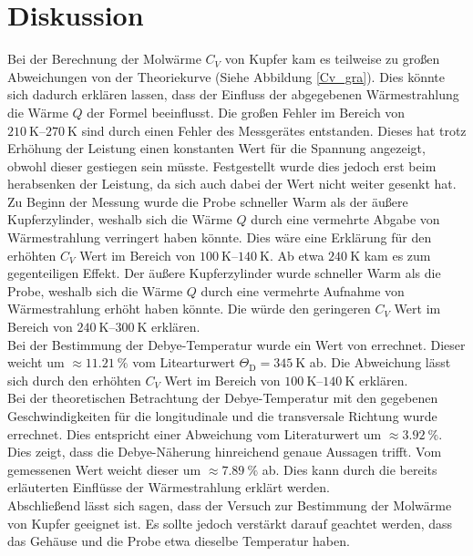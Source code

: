 \section{Diskussion} %
\label{sec:diskussion}

Bei der Berechnung der Molwärme $C_V$ von Kupfer kam es teilweise zu großen Abweichungen von der Theoriekurve (Siehe Abbildung \ref{Cv_gra}). 
Dies könnte sich dadurch erklären lassen, dass der Einfluss der abgegebenen Wärmestrahlung die Wärme $Q$ der Formel beeinflusst.
Die großen Fehler im Bereich von $\SIrange{210}{270}{\kelvin}$ sind durch einen Fehler des Messgerätes entstanden.
Dieses hat trotz Erhöhung der Leistung einen konstanten Wert für die Spannung angezeigt, obwohl dieser gestiegen sein müsste.
Festgestellt wurde dies jedoch erst beim herabsenken der Leistung, da sich auch dabei der Wert nicht weiter gesenkt hat.\\

Zu Beginn der Messung wurde die Probe schneller Warm als der äußere Kupferzylinder, weshalb sich die Wärme $Q$ durch eine vermehrte Abgabe von Wärmestrahlung verringert haben könnte.
Dies wäre eine Erklärung für den erhöhten $C_V$ Wert im Bereich von $\SIrange{100}{140}{\kelvin}$.
Ab etwa $\SI{240}{\kelvin}$ kam es zum gegenteiligen Effekt.
Der äußere Kupferzylinder wurde schneller Warm als die Probe, weshalb sich die Wärme $Q$ durch eine vermehrte Aufnahme von Wärmestrahlung erhöht haben könnte.
Die würde den geringeren $C_V$ Wert im Bereich von $\SIrange{240}{300}{\kelvin}$ erklären.\\

Bei der Bestimmung der Debye-Temperatur wurde ein Wert von  errechnet.
Dieser weicht um $\approx \SI{11.21}{\percent}$ vom Litearturwert $\Theta_\mathrm{D} = \SI{345}{\kelvin}$ \cite{kupfer3} ab.
Die Abweichung lässt sich durch den erhöhten $C_V$ Wert im Bereich von $\SIrange{100}{140}{\kelvin}$ erklären.\\

Bei der theoretischen Betrachtung der Debye-Temperatur mit den gegebenen Geschwindigkeiten für die longitudinale und die transversale Richtung wurde  errechnet.
Dies entspricht einer Abweichung vom Literaturwert um $\approx \SI{3.92}{\percent}$. 
Dies zeigt, dass die Debye-Näherung hinreichend genaue Aussagen trifft.
Vom gemessenen Wert weicht dieser um $\approx \SI{7.89}{\percent}$ ab.
Dies kann durch die bereits erläuterten Einflüsse der Wärmestrahlung erklärt werden.\\

Abschließend lässt sich sagen, dass der Versuch zur Bestimmung der Molwärme von Kupfer geeignet ist.
Es sollte jedoch verstärkt darauf geachtet werden, dass das Gehäuse und die Probe etwa dieselbe Temperatur haben.